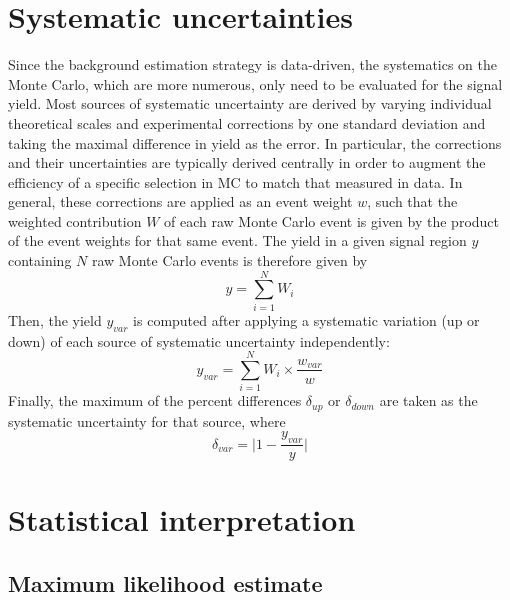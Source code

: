 \section{Systematic uncertainties}
Since the background estimation strategy is data-driven, the systematics on the Monte Carlo, which are more numerous, only need to be evaluated for the signal yield. 
Most sources of systematic uncertainty are derived by varying individual theoretical scales and experimental corrections by one standard deviation and taking the maximal difference in yield as the error. 
In particular, the corrections and their uncertainties are typically derived centrally in order to augment the efficiency of a specific selection in MC to match that measured in data.
In general, these corrections are applied as an event weight $w$, such that the weighted contribution $W$ of each raw Monte Carlo event is given by the product of the event weights for that same event. 
The yield in a given signal region $y$ containing $N$ raw Monte Carlo events is therefore given by
\begin{equation}
    y = \sum_{i = 1}^{N}W_i
\end{equation}
Then, the yield $y_{var}$ is computed after applying a systematic variation (up or down) of each source of systematic uncertainty independently:
\begin{equation}\label{eq:systs}
    y_{var} = \sum_{i = 1}^{N}W_i\times\frac{w_{var}}{w}
\end{equation}
Finally, the maximum of the percent differences $\delta_{up}$ or $\delta_{down}$ are taken as the systematic uncertainty for that source, where
\begin{equation}
    \delta_{var} = \bigg| 1-\frac{y_{var}}{y} \bigg|
\end{equation}

\section{Statistical interpretation}
\subsection{Maximum likelihood estimate}

